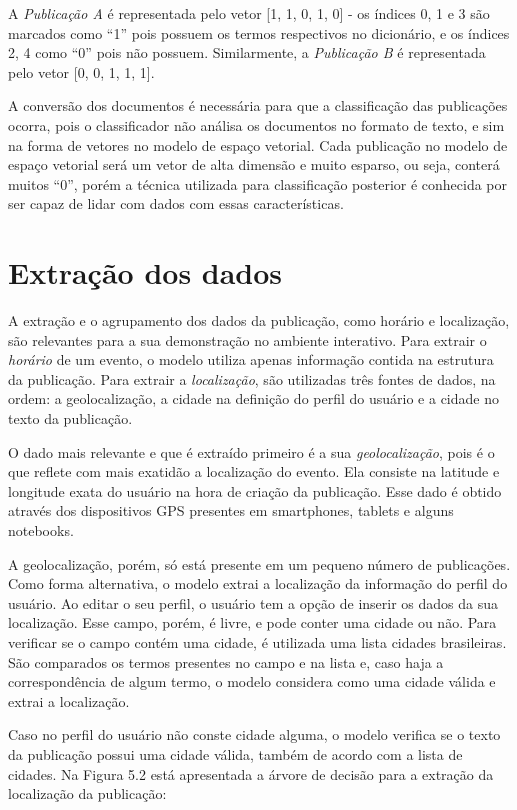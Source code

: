 A \textit{Publicação A} é representada pelo vetor [1, 1, 0, 1, 0] - os índices 0, 1 e 3 são marcados como ``1'' pois possuem os termos respectivos no dicionário, e os índices 2, 4 como ``0'' pois não possuem. Similarmente, a \textit{Publicação B} é representada pelo vetor [0, 0, 1, 1, 1].

A conversão dos documentos é necessária para que a classificação das publicações ocorra, pois o classificador não análisa os documentos no formato de texto, e sim na forma de vetores no modelo de espaço vetorial. Cada publicação no modelo de espaço vetorial será um vetor de alta dimensão e muito esparso, ou seja, conterá muitos ``0'', porém a técnica utilizada para classificação posterior é conhecida por ser capaz de lidar com dados com essas características.

\section{Extração dos dados}

A extração e o agrupamento dos dados da publicação, como horário e localização, são relevantes para a sua demonstração no ambiente interativo. Para extrair o \textit{horário} de um evento, o modelo utiliza apenas informação contida na estrutura da publicação. Para extrair a \textit{localização}, são utilizadas três fontes de dados, na ordem: a geolocalização, a cidade na definição do perfil do usuário e a cidade no texto da publicação. 

O dado mais relevante e que é extraído primeiro é a sua \textit{geolocalização}, pois é o que reflete com mais exatidão a localização do evento. Ela consiste na latitude e longitude exata do usuário na hora de criação da publicação. Esse dado é obtido através dos dispositivos GPS presentes em smartphones, tablets e alguns notebooks.

A geolocalização, porém, só está presente em um pequeno número de publicações. Como forma alternativa, o modelo extrai a localização da informação do perfil do usuário. Ao editar o seu perfil, o usuário tem a opção de inserir os dados da sua localização. Esse campo, porém, é livre, e pode conter uma cidade ou não. Para verificar se o campo contém uma cidade, é utilizada uma lista cidades brasileiras. São comparados os termos presentes no campo e na lista e, caso haja a correspondência de algum termo, o modelo considera como uma cidade válida e extrai a localização.

Caso no perfil do usuário não conste cidade alguma, o modelo verifica se o texto da publicação possui uma cidade válida, também de acordo com a lista de cidades. Na Figura 5.2 está apresentada a árvore de decisão para a extração da localização da publicação:

